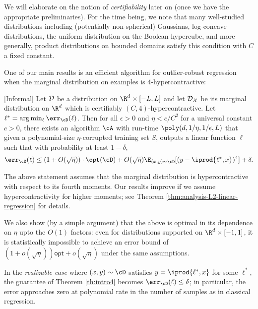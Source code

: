 We will elaborate on the notion of \emph{certifiability} later on (once we have the appropriate preliminaries). For the time being, we note that many well-studied distributions including (potentially non-spherical) Gaussians, log-concave distributions, the uniform distribution on the Boolean hypercube, and more generally, product distributions on bounded domains satisfy this condition with $C$ a fixed constant. 

One of our main results is an efficient algorithm for outlier-robust regression when the marginal distribution on examples is $4$-hypercontractive:

\begin{theorem}\label{th:intro4}[Informal]
Let ${\cal D}$ be a distribution on $\R^{d} \times [-L,L]$ and let ${\cal D_{X}}$ be its
marginal distribution on $\R^d$ which is certifiably $(C,4)$-hypercontractive. Let $\ell^* = \arg\min_{\ell} \err_{\cD}(\ell)$. Then for all $\epsilon > 0$ and $\eta < c/C^2$ for a universal constant $c > 0$,  there exists an algorithm $\cA$ with run-time $\poly(d,1/\eta,1/\epsilon,L)$ that given a polynomial-size $\eta$-corrupted training set $S$, outputs a linear function $\ell$ such that with probability at least  $1-\delta$, 
$$\err_{\cD}(\ell) \leq (1 + O(\sqrt{\eta})) \cdot \opt(\cD)  + O(\sqrt{\eta}) \E_{(x,y) \sim \cD}[(y - \iprod{\ell^*,x})^4] + \delta.$$

\end{theorem}

The above statement assumes that the marginal distribution is
hypercontractive with respect to its fourth moments.  Our results improve if we assume hypercontractivity for higher moments; see Theorem \ref{thm:analysis-L2-linear-regression} for details. 

We also show (by a simple argument) that the above is optimal in its dependence on $\eta$ upto the $O(1)$ factors: even for distributions supported on $\R^d \times [-1,1]$, it is statistically impossible to achieve an error bound of $(1 + o(\sqrt{\eta})) \mathsf{opt} + o(\sqrt{\eta})$ under the same assumptions. 

In the \emph{realizable case} where $(x,y) \sim \cD$ satisfies $y = \iprod{\ell^*,x}$ for some $\ell^*$, the guarantee of Theorem \ref{th:intro4} becomes $\err_\cD(\ell) \leq \delta$; in particular, the error approaches zero at polynomial rate in the number of samples as in classical regression. 

